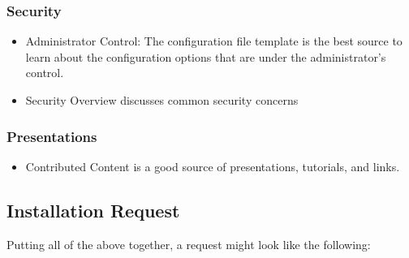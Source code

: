 \documentclass[letterpaper,10pt,english]{sphinxmanual}
\begin{document}
\subsubsection{Security}
\label{\detokenize{installation:security}}\begin{itemize}
\item {} 
Administrator Control: The configuration file template is the best source to learn about the configuration options that are under the administrator’s control.

\item {} 
Security Overview discusses common security concerns

\end{itemize}


\subsubsection{Presentations}
\label{\detokenize{installation:presentations}}\begin{itemize}
\item {} 
Contributed Content is a good source of presentations, tutorials, and links.

\end{itemize}


\subsection{Installation Request}
\label{\detokenize{installation:installation-request}}\label{\detokenize{installation:id7}}
Putting all of the above together, a request might look like the following:
\end{document}
